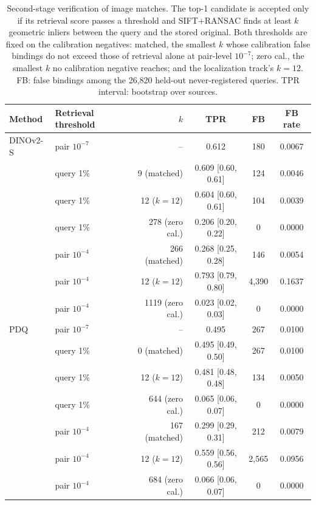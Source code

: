 \begin{table}[!t]
\centering
\footnotesize
\caption{Second-stage verification of image matches. The top-1 candidate is accepted only if its retrieval score passes a threshold and SIFT+RANSAC finds at least $k$ geometric inliers between the query and the stored original. Both thresholds are fixed on the calibration negatives: matched, the smallest $k$ whose calibration false bindings do not exceed those of retrieval alone at pair-level $10^{-7}$; zero cal., the smallest $k$ no calibration negative reaches; and the localization track's $k=12$. FB: false bindings among the 26{,}820 held-out never-registered queries. TPR interval: bootstrap over sources.}
\label{tab:verify}
\setlength{\tabcolsep}{3pt}
\begin{tabular}{llrccc}
\toprule
Method & Retrieval threshold & $k$ & TPR & FB & FB rate \\
\midrule
DINOv2-S & pair $10^{-7}$ & -- & 0.612 & 180 & 0.0067 \\
 & query 1\% & 9 (matched) & 0.609 \tiny[0.60, 0.61] & 124 & 0.0046 \\
 & query 1\% & 12 ($k=12$) & 0.604 \tiny[0.60, 0.61] & 104 & 0.0039 \\
 & query 1\% & 278 (zero cal.) & 0.206 \tiny[0.20, 0.22] & 0 & 0.0000 \\
 & pair $10^{-4}$ & 266 (matched) & 0.268 \tiny[0.25, 0.28] & 146 & 0.0054 \\
 & pair $10^{-4}$ & 12 ($k=12$) & 0.793 \tiny[0.79, 0.80] & 4{,}390 & 0.1637 \\
 & pair $10^{-4}$ & 1119 (zero cal.) & 0.023 \tiny[0.02, 0.03] & 0 & 0.0000 \\
\addlinespace
PDQ & pair $10^{-7}$ & -- & 0.495 & 267 & 0.0100 \\
 & query 1\% & 0 (matched) & 0.495 \tiny[0.49, 0.50] & 267 & 0.0100 \\
 & query 1\% & 12 ($k=12$) & 0.481 \tiny[0.48, 0.48] & 134 & 0.0050 \\
 & query 1\% & 644 (zero cal.) & 0.065 \tiny[0.06, 0.07] & 0 & 0.0000 \\
 & pair $10^{-4}$ & 167 (matched) & 0.299 \tiny[0.29, 0.31] & 212 & 0.0079 \\
 & pair $10^{-4}$ & 12 ($k=12$) & 0.559 \tiny[0.56, 0.56] & 2{,}565 & 0.0956 \\
 & pair $10^{-4}$ & 684 (zero cal.) & 0.066 \tiny[0.06, 0.07] & 0 & 0.0000 \\
\bottomrule
\end{tabular}

\end{table}
